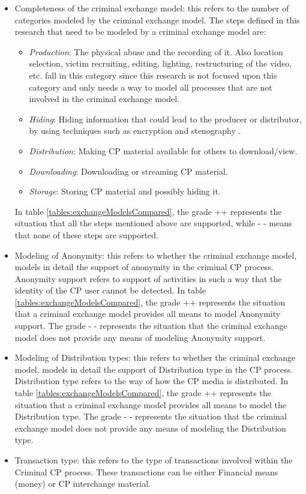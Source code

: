\documentclass{sig-alternate-br}
\begin{document}
\begin{itemize}
	\item Completeness of the criminal exchange model: this refers to the number of categories modeled by the criminal exchange model. 
		The steps defined in this research that need to be modeled by a criminal exchange model are:
		\begin{itemize}
			\item \textit{Production}: The physical abuse and the recording of it. Also location selection, victim recruiting, editing, lighting, restructuring of the video, etc. fall in this category since this research is not focused upon this category and only needs a way to model all processes that are not involved in the criminal exchange model.
			\item \textit{Hiding}: Hiding information that could lead to the producer or distributor, by using techniques such as encryption and stenography \cite{krone2005international}.
			\item \textit{Distribution}: Making CP material available for others to download/view.
			\item \textit{Downloading}: Downloading or streaming CP material.
			\item \textit{Storage}: Storing CP material and possibly hiding it.
		\end{itemize}
		In table \ref{tables:exchangeModelsCompared}, the grade ++ represents the situation that all the steps mentioned above are supported, while - - means that none of these steps are supported.
	\item Modeling of Anonymity: this refers to whether the criminal exchange model, models in detail the support of anonymity in the criminal CP process. Anonymity support refers to support of activities in such a way that the identity of the CP user cannot be detected. In table \ref{tables:exchangeModelsCompared}, the grade ++ represents the situation that a criminal exchange model provides all means to model Anonymity support. The grade - - represents the situation that the criminal exchange model does not  provide any means of modeling Anonymity support.
	\item Modeling of Distribution types: this refers to whether the criminal exchange model, models in detail the support of Distribution type in the CP process. Distribution type refers to the way of how the CP media is distributed. In table \ref{tables:exchangeModelsCompared}, the grade ++ represents the situation that a criminal exchange model provides all means to model the Distribution type. The grade - - represents the situation that the criminal exchange model does not provide any means of modeling the Distribution type.
	\item Transaction type: this refers to the type of transactions involved within the Criminal CP process. These transactions can be either Financial means (money) or CP interchange material. 
\end{itemize}
\end{document}
